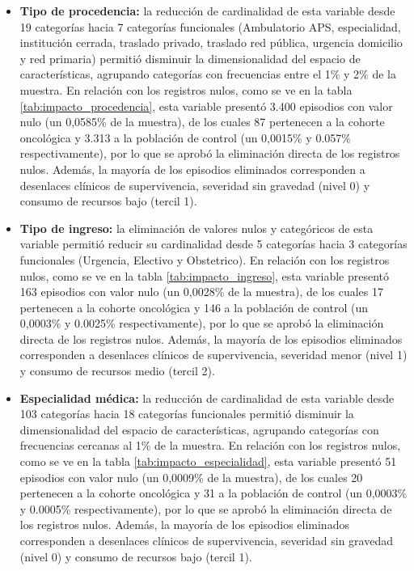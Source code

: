 \begin{itemize}
    \item \textbf{Tipo de procedencia:} la reducción de cardinalidad de esta variable desde 19 categorías hacia 7 categorías funcionales (Ambulatorio APS, especialidad, institución cerrada, traslado privado, traslado red pública, urgencia domicilio y red primaria) permitió disminuir la dimensionalidad del espacio de características, agrupando categorías con frecuencias entre el 1\% y 2\% de la muestra. En relación con los registros nulos, como se ve en la tabla \ref{tab:impacto_procedencia}, esta variable presentó 3.400 episodios con valor nulo (un 0,0585\% de la muestra), de los cuales 87 pertenecen a la cohorte oncológica y 3.313 a la población de control (un 0,0015\% y 0.057\% respectivamente), por lo que se aprobó la eliminación directa de los registros nulos. Además, la mayoría de los episodios eliminados corresponden a desenlaces clínicos de supervivencia, severidad sin gravedad (nivel 0) y consumo de recursos bajo (tercil 1).
    \item \textbf{Tipo de ingreso:} la eliminación de valores nulos y categóricos de esta variable permitió reducir su cardinalidad desde 5 categorías hacia 3 categorías funcionales (Urgencia, Electivo y Obstetrico). En relación con los registros nulos, como se ve en la tabla \ref{tab:impacto_ingreso}, esta variable presentó 163 episodios con valor nulo (un 0,0028\% de la muestra), de los cuales 17 pertenecen a la cohorte oncológica y 146 a la población de control (un 0,0003\% y 0.0025\% respectivamente), por lo que se aprobó la eliminación directa de los registros nulos. Además, la mayoría de los episodios eliminados corresponden a desenlaces clínicos de supervivencia, severidad menor (nivel 1) y consumo de recursos medio (tercil 2).
    \item \textbf{Especialidad médica:} la reducción de cardinalidad de esta variable desde 103 categorías hacia 18 categorías funcionales permitió disminuir la dimensionalidad del espacio de características, agrupando categorías con frecuencias cercanas al 1\% de la muestra. En relación con los registros nulos, como se ve en la tabla \ref{tab:impacto_especialidad}, esta variable presentó 51 episodios con valor nulo (un 0,0009\% de la muestra), de los cuales 20 pertenecen a la cohorte oncológica y 31 a la población de control (un 0,0003\% y 0.0005\% respectivamente), por lo que se aprobó la eliminación directa de los registros nulos. Además, la mayoría de los episodios eliminados corresponden a desenlaces clínicos de supervivencia, severidad sin gravedad (nivel 0) y consumo de recursos bajo (tercil 1).

\end{itemize}
